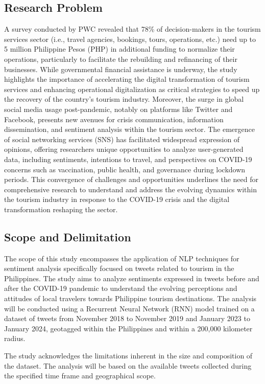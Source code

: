 \documentclass[journal]{./IEEE/IEEEtran}
\begin{document}
\subsection{Research Problem}
A survey conducted by PWC \cite{two:pwc-tourism-covid19} revealed that 78\% of decision-makers in the tourism services sector 
(i.e., travel agencies, bookings, tours, operations, etc.) need up to 5 million Philippine Pesos (PHP) 
in additional funding to normalize their operations, particularly to facilitate the rebuilding and 
refinancing of their businesses. While governmental financial assistance is underway, the study 
highlights the importance of accelerating the digital transformation of tourism services and enhancing 
operational digitalization as critical strategies to speed up the recovery of the country’s tourism 
industry. Moreover, the surge in global social media usage post-pandemic, notably on platforms like Twitter and 
Facebook, presents new avenues for crisis communication, information dissemination, and sentiment analysis 
within the tourism sector. The emergence of social networking services (SNS) has facilitated widespread expression
of opinions, offering researchers unique opportunities to analyze user-generated data, including sentiments, 
intentions to travel, and perspectives on COVID-19 concerns\cite{one:ugur2020impacts} such as vaccination, public health, and governance during lockdown 
periods. This convergence of challenges and opportunities underlines the need for comprehensive research to understand and 
address the evolving dynamics within the tourism industry in response to the COVID-19 crisis and the digital 
transformation reshaping the sector. 

\subsection{Scope and Delimitation}
The scope of this study encompasses the application of NLP techniques for sentiment analysis specifically focused on tweets related to tourism in the Philippines. The study aims to analyze sentiments expressed in tweets before and after the COVID-19 pandemic to understand the evolving perceptions and attitudes of local travelers towards Philippine tourism destinations. The analysis will be conducted using a Recurrent Neural Network (RNN) model trained on a dataset of tweets from November 2018 to November 2019 and January 2023 to January 2024, geotagged within the Philippines and within a 200,000 kilometer radius.

The study acknowledges the limitations inherent in the size and composition of the dataset. The analysis will be based on the available tweets collected during the specified time frame and geographical scope. 
\end{document}
